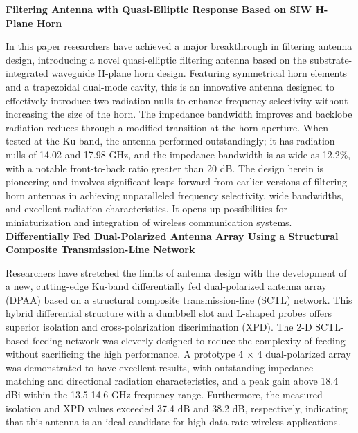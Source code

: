 \documentclass[12pt]{article}
\begin{document}
\noindent \textbf{Filtering Antenna with Quasi-Elliptic Response Based on SIW H-Plane Horn}
\par In this paper researchers have achieved a major breakthrough in filtering antenna design, introducing a novel quasi-elliptic filtering antenna based on the substrate-integrated waveguide H-plane horn design. Featuring symmetrical horn elements and a trapezoidal dual-mode cavity, this is an innovative antenna designed to effectively introduce two radiation nulls to enhance frequency selectivity without increasing the size of the horn. The impedance bandwidth improves and backlobe radiation reduces through a modified transition at the horn aperture. When tested at the Ku-band, the antenna performed outstandingly; it has radiation nulls of 14.02 and 17.98 GHz, and the impedance bandwidth is as wide as 12.2\%, with a notable front-to-back ratio greater than 20 dB. The design herein is pioneering and involves significant leaps forward from earlier versions of filtering horn antennas in achieving unparalleled frequency selectivity, wide bandwidths, and excellent radiation characteristics. It opens up possibilities for miniaturization and integration of wireless communication systems.\\

\noindent \textbf{Differentially Fed Dual-Polarized Antenna Array Using a Structural Composite Transmission-Line Network}
\par Researchers have stretched the limits of antenna design with the development of a new, cutting-edge Ku-band differentially fed dual-polarized antenna array (DPAA) based on a structural composite transmission-line (SCTL) network. This hybrid differential structure with a dumbbell slot and L-shaped probes offers superior isolation and cross-polarization discrimination (XPD). The 2-D SCTL-based feeding network was cleverly designed to reduce the complexity of feeding without sacrificing the high performance. A prototype 4 × 4 dual-polarized array was demonstrated to have excellent results, with outstanding impedance matching and directional radiation characteristics, and a peak gain above 18.4 dBi within the 13.5-14.6 GHz frequency range. Furthermore, the measured isolation and XPD values exceeded 37.4 dB and 38.2 dB, respectively, indicating that this antenna is an ideal candidate for high-data-rate wireless applications.\\
\end{document}
